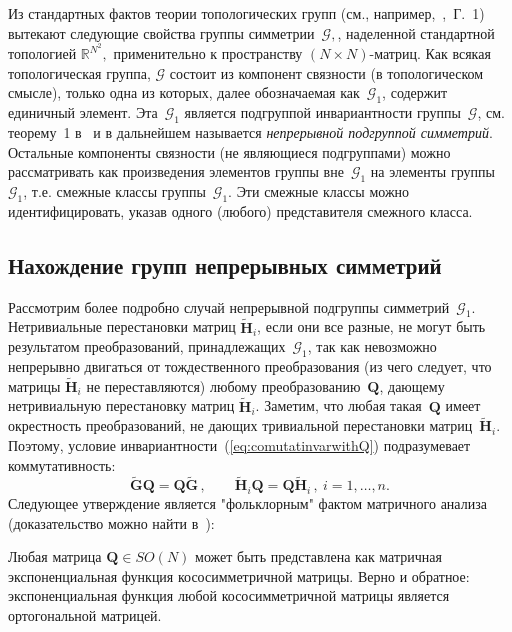 {Из стандартных фактов теории топологических групп (см., например,~\cite{Zhelobenko},~Г.~1) вытекают следующие свойства группы симметрии~$\mathcal{G},$, наделенной стандартной топологией ${\mathbb R} ^{N^2},$ применительно к пространству $(N\times N)$-матриц. Как всякая топологическая группа, $\mathcal{G}$ состоит из компонент связности (в топологическом смысле), только одна из которых, далее обозначаемая как~$\mathcal{G}_1$, содержит единичный элемент. Эта~$\mathcal{G}_1$ является подгруппой инвариантности группы~$\mathcal{G}$, см. теорему~1 в~\cite{Zhelobenko} и в дальнейшем называется {\em непрерывной подгруппой симметрий}. Остальные компоненты связности (не являющиеся подгруппами) можно рассматривать как произведения элементов группы вне~$\mathcal G_1$ на элементы группы~$\mathcal G_1$, т.е. смежные классы группы~$\mathcal G_1$. Эти смежные классы можно идентифицировать, указав одного (любого) представителя смежного класса.

\subsection{Нахождение групп непрерывных симметрий}
\label{sec:sym_cont}
Рассмотрим более подробно случай непрерывной подгруппы симметрий~$\mathcal{G}_1$. Нетривиальные перестановки матриц $\tilde{\textbf{H}}_i$, если они все разные, не могут быть результатом преобразований, принадлежащих~$\mathcal{G}_1$, так как невозможно непрерывно двигаться от тождественного преобразования (из чего следует, что матрицы $\tilde{\textbf{H}}_i$ не переставляются) любому преобразованию~$\textbf{Q}$, дающему нетривиальную перестановку матриц $\tilde{\textbf{H}}_i$. Заметим, что любая такая~$\textbf{Q}$ имеет окрестность преобразований, не дающих тривиальной перестановки матриц~$\tilde{\textbf{H}}_i$. Поэтому, условие инвариантности~(\ref{eq:comutatinvarwithQ}) подразумевает коммутативность:
%
\begin{equation}
\label{eq:commutat}
\tilde{\textbf{G}} \textbf{Q} = \textbf{Q} \tilde{\textbf{G}}\, , \qquad \tilde{\textbf{H}}_i \textbf{Q} = \textbf{Q} \tilde{\textbf{H}}_i\, , \ i=1,\dots,n.
\end{equation}
%
Следующее утверждение является "фольклорным" фактом матричного анализа (доказательство можно найти в~\cite{yurkov:symmetry}):

\begin{proposition} \label{prop:skew_exp}
Любая матрица $\textbf{Q} \in SO(N) $ может быть представлена как матричная экспоненциальная функция кососимметричной матрицы. Верно и обратное: экспоненциальная функция любой кососимметричной матрицы является ортогональной матрицей.
\end{proposition}

}
